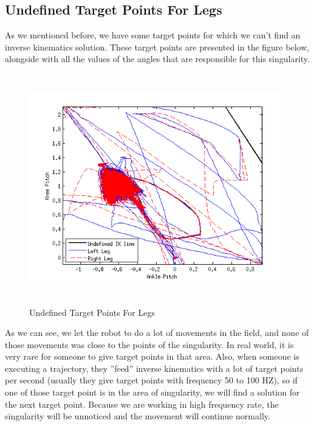 \subsection{Undefined Target Points For Legs}
As we mentioned before, we have some target points for which we can't find an inverse kinematics solution. These target points are presented in the figure below, alongside with all the values of the angles that are responsible for this singularity.
\begin{figure}[h]
	\begin{center}
		\includegraphics[height = 10cm]{Figures/undefined.png}
 		\caption{Undefined Target Points For Legs}
 		\label{fig:undefined}
	\end{center}
\end{figure}
As we can see, we let the robot to do a lot of movements in the field, and none of those movements was close to the points of the singularity. In real world, it is very rare for someone to give target points in that area. Also, when someone is executing a trajectory, they ''feed'' inverse kinematics with a lot of target points per second (usually they give target points with frequency 50 to 100 HZ), so if one of those target point is in the area of singularity, we will find a solution for the next target point. Because we are working in high frequency rate, the singularity will be unnoticed and the movement will continue normally.

